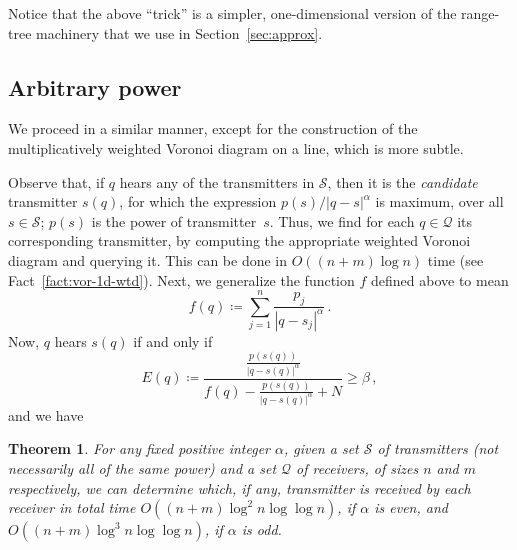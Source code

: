 \documentclass[11pt]{article}
\newtheorem{theorem}{Theorem}[section]
\theoremstyle{remark}
\def\Q{\mathcal{Q}}
\def\S{\mathcal{S}}
\begin{document}
Notice that the above ``trick'' is a simpler, one-dimensional version of the range-tree machinery that we use in Section~\ref{sec:approx}.



\subsection{Arbitrary power}
\label{sec:1d-non-uni}



We proceed in a similar manner, except for the construction of the multiplicatively weighted Voronoi diagram on a line, which is more subtle.

Observe that, if $q$ hears any of the transmitters in $\S$, then it is the \emph{candidate} transmitter $s(q)$, for which the expression $p(s)/|q-s|^\alpha$ is maximum, over all~$s \in \S$; $p(s)$ is the power of transmitter~$s$. 
Thus, we find for each $q \in \Q$ its corresponding transmitter, by
computing the appropriate weighted Voronoi diagram and querying it. This can be done in $O((n + m) \log n)$ time (see Fact~\ref{fact:vor-1d-wtd}).  
Next, we generalize the function $f$ defined above to mean
\[
f(q) \coloneqq \sum_{j = 1}^n {\frac{p_j}{|q-s_j|^\alpha}}\, .
\]
Now, $q$ hears $s(q)$ if and only if 
\[
E(q) \coloneqq \frac{\frac{p(s(q))}{|q-s(q)|^\alpha}}{f(q) - \frac{p(s(q))}{|q-s(q)|^\alpha} + N} \geq \beta \, ,
\]
and we have

\begin{theorem}
  \label{th:1d-batch-nonuniform}
  For any fixed positive integer $\alpha$, given a set $\S$ of
  transmitters (not necessarily all of the same power) and a set $\Q$
  of receivers, of sizes $n$ and $m$ respectively, we can determine
  which, if any, transmitter is received by each receiver in total
  time $O((n + m) \log^2 n \log \log n)$, if $\alpha$ is even, and $O((n + m) \log^3 n \log \log n)$, if $\alpha$ is odd.
\end{theorem}
\end{document}

